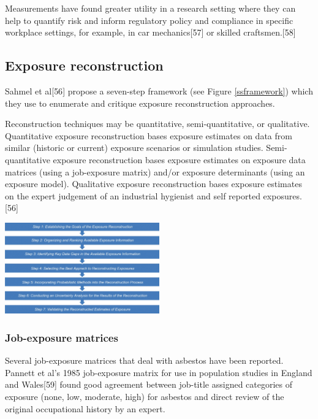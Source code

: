 \documentclass[12pt,a4paper,]{report}
\let\origfigure=\figure
\let\endorigfigure=\endfigure
\renewenvironment{figure}[1][]{%
\origfigure[b]
}{%
\endorigfigure
}
\begin{document}
Measurements have found greater utility in a research setting where they
can help to quantify risk and inform regulatory policy and compliance in
specific workplace settings, for example, in car mechanics{[}57{]} or
skilled craftsmen.{[}58{]}

\hypertarget{exposure-reconstruction}{%
\subsection{Exposure reconstruction}\label{exposure-reconstruction}}

Sahmel et al{[}56{]} propose a seven-step framework (see Figure
\ref{ssframework}) which they use to enumerate and critique exposure
reconstruction approaches.

Reconstruction techniques may be quantitative, semi-quantitative, or
qualitative. Quantitative exposure reconstruction bases exposure
estimates on data from similar (historic or current) exposure scenarios
or simulation studies. Semi-quantitative exposure reconstruction bases
exposure estimates on exposure data matrices (using a job-exposure
matrix) and/or exposure determinants (using an exposure model).
Qualitative exposure reconstruction bases exposure estimates on the
expert judgement of an industrial hygienist and self reported
exposures.{[}56{]}

\begin{figure}
\centering
\includegraphics[width=0.5\textwidth,height=\textheight]{./tex2pdf.-c788ce828caea25c/eae30e5bbeba97abd6c389a0e99961dc789fc4a9.png}
\caption{Seven step framework for exposure
reconstruction\label{ssframework}}
\end{figure}

\hypertarget{job-exposure-matrices}{%
\subsubsection{Job-exposure matrices}\label{job-exposure-matrices}}

Several job-exposure matrices that deal with asbestos have been
reported. Pannett et al's 1985 job-exposure matrix for use in population
studies in England and Wales{[}59{]} found good agreement between
job-title assigned categories of exposure (none, low, moderate, high)
for asbestos and direct review of the original occupational history by
an expert.
\end{document}
